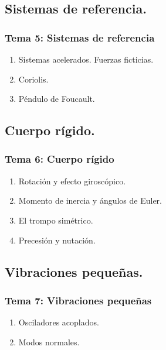 \documentclass[12pt]{beamer}
\begin{document}
\subsection{Sistemas de referencia.}

\begin{frame}
\frametitle{\textbf{Tema 5: Sistemas de referencia}}
\begin{enumerate}[<+->]
\item Sistemas acelerados. Fuerzas ficticias.
\item Coriolis.
\item Péndulo de Foucault.
\end{enumerate}
\end{frame}

\subsection{Cuerpo rígido.}

\begin{frame}
\frametitle{\textbf{Tema 6: Cuerpo rígido}}
\begin{enumerate}[<+->]
\item Rotación y efecto giroscópico.
\item Momento de inercia y ángulos de Euler.
\item El trompo simétrico.
\item Precesión y nutación.
\end{enumerate}
\end{frame}

\subsection{Vibraciones pequeñas.}

\begin{frame}
\frametitle{\textbf{Tema 7: Vibraciones pequeñas}}
\begin{enumerate}[<+->]
\item Osciladores acoplados.
\item Modos normales.
\end{enumerate}
\end{frame}
\end{document}
